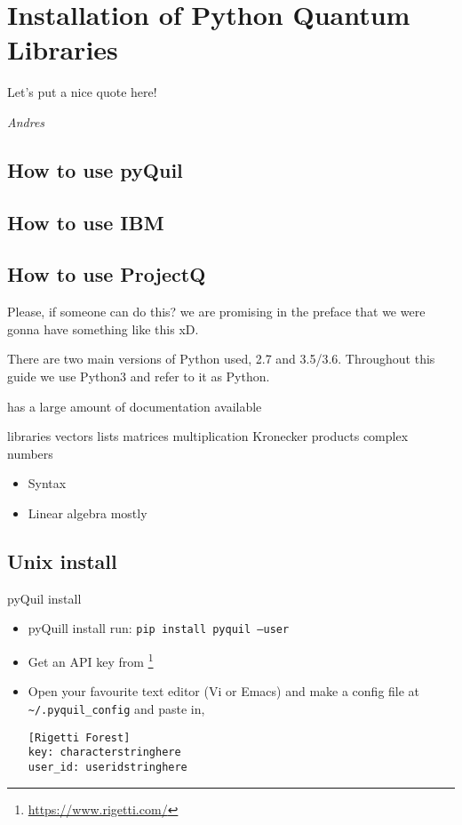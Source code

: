 \chapter{Installation of Python Quantum Libraries}
\label{chpt:pythontutorial}

\epigraph{Let's put a nice quote here!}{\textit{Andres}}


\section{How to use pyQuil}


\section{How to use IBM}


\section{How to use ProjectQ}




Please, if someone can do this? we are promising in the preface that we were gonna have something like this xD.

There are two main versions of Python used, 2.7 and 3.5/3.6. Throughout this guide we use Python3 and refer to it as Python.  

has a large amount of documentation available


libraries
vectors lists
matrices multiplication 
Kronecker products
complex numbers

\begin{itemize}
    \item Syntax
    \item Linear algebra mostly
\end{itemize}

\section{Unix install}

pyQuil install
\begin{itemize}
    \item pyQuill install run: \texttt{pip install pyquil --user}
    \item Get an API key from \footnote{\url{https://www.rigetti.com/}}
    \item Open your favourite text editor (Vi or Emacs) and make a config file at \texttt{\textasciitilde/.pyquil\_config} and paste in, \begin{verbatim}[Rigetti Forest]
key: characterstringhere
user_id: useridstringhere 
\end{verbatim}
\end{itemize}

